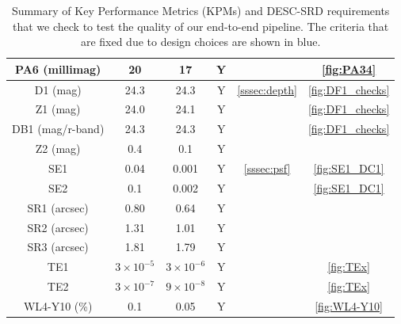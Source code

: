 \documentclass[\docopts]{\docclass}
\begin{document}
\begin{table}
\begin{tabular}{|c|c|c|c|c|c|}
PA6 (millimag) & 20 & 17 & Y  &  & \ref{fig:PA34}\\
\hline
D1 (mag) & 24.3 & 24.3 & Y & \ref{sssec:depth} & \ref{fig:DF1_checks}\\
Z1 (mag) & 24.0 & 24.1 & Y & & \ref{fig:DF1_checks}\\
DB1 (mag/r-band) & 24.3 & 24.3 & Y &  & \ref{fig:DF1_checks}\\
Z2 (mag) & 0.4 & 0.1 & Y &  & \\
\hline
SE1 & 0.04 & 0.001 & Y & \ref{sssec:psf} & \ref{fig:SE1_DC1}\\
SE2 & 0.1 & 0.002 & Y & & \ref{fig:SE1_DC1}\\
SR1 (arcsec) & 0.80 & 0.64 & Y & & \\
SR2 (arcsec) & 1.31 & 1.01 & Y & & \\
SR3 (arcsec) & 1.81 & 1.79 & Y & &\\
TE1 & $3 \times 10^{-5}$ & $3\times 10^{-6}$ & Y & & \ref{fig:TEx}\\
TE2 & $3 \times 10^{-7}$ & $9\times 10^{-8}$ & Y & & \ref{fig:TEx}\\
\hline
WL4-Y10 (\%) & 0.1 & 0.05 & Y & & \ref{fig:WL4-Y10}\\
\end{tabular}
\caption{Summary of Key Performance Metrics (KPMs) and DESC-SRD requirements that we check to test the quality of our end-to-end pipeline. The criteria that are fixed due to design choices are shown in blue.} %
\label{tab:kpm_table}
\end{table}
\end{document}
